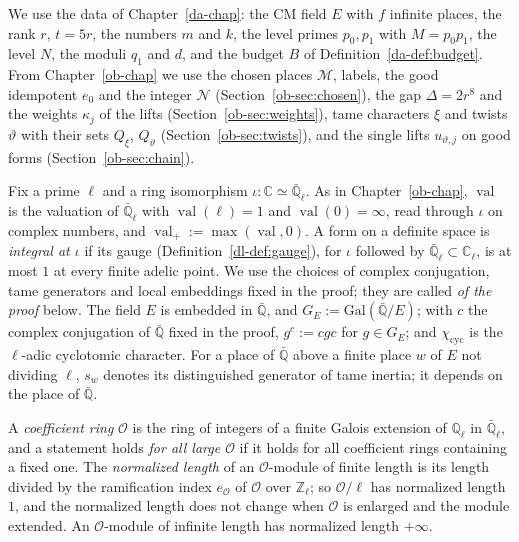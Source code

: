 \documentclass[reqno]{amsart}
\newcounter{chap}
\theoremstyle{definition}
\theoremstyle{plain}
\newcommand{\Z}{\mathbb{Z}}
\newcommand{\Q}{\mathbb{Q}}
\newcommand{\C}{\mathbb{C}}
\newcommand{\Oc}{\mathcal{O}}
\newcommand{\cyc}{\chi_{\mathrm{cyc}}}
\newcommand{\val}{\operatorname{val}}
\begin{document}
We use the data of Chapter~\ref{da-chap}: the CM field \(E\) with \(f\) infinite places, the rank \(r\), \(t = 5r\), the numbers \(m\) and \(k\), the level primes \(p_0, p_1\) with \(M = p_0p_1\), the level \(N\), the moduli \(q_1\) and \(d\), and the budget \(B\) of Definition~\ref{da-def:budget}.  From Chapter~\ref{ob-chap} we use the chosen places \(\mathcal M\), labels, the good idempotent \(e_0\) and the integer \(\mathcal N\) (Section~\ref{ob-sec:chosen}), the gap \(\Delta = 2r^8\) and the weights \(\kappa_j\) of the lifts (Section~\ref{ob-sec:weights}), tame characters \(\xi\) and twists \(\vartheta\) with their sets \(Q_\xi\), \(Q_\vartheta\) (Section~\ref{ob-sec:twists}), and the single lifts \(u_{\vartheta,j}\) on good forms (Section~\ref{ob-sec:chain}).

Fix a prime \(\ell\) and a ring isomorphism \(\iota \colon \C \simeq \bar{\Q}_\ell\).  As in Chapter~\ref{ob-chap}, \(\val\) is the valuation of \(\bar{\Q}_\ell\) with \(\val(\ell) = 1\) and \(\val(0) = \infty\), read through \(\iota\) on complex numbers, and \(\val_+ := \max(\val, 0)\).  A form on a definite space is \emph{integral at \(\iota\)} if its gauge (Definition~\ref{dl-def:gauge}), for \(\iota\) followed by \(\bar{\Q}_\ell \subset \C_\ell\), is at most \(1\) at every finite adelic point.  We use the choices of complex conjugation, tame generators and local embeddings fixed in the proof; they are called \emph{of the proof} below.  The field \(E\) is embedded in \(\bar{\Q}\), and \(G_E := \mathrm{Gal}(\bar{\Q}/E)\); with \(c\) the complex conjugation of \(\bar{\Q}\) fixed in the proof, \(g^c := cgc\) for \(g \in G_E\); and \(\cyc\) is the \(\ell\)-adic cyclotomic character.  For a place of \(\bar{\Q}\) above a finite place \(w\) of \(E\) not dividing \(\ell\), \(s_w\) denotes its distinguished generator of tame inertia; it depends on the place of \(\bar{\Q}\).

A \emph{coefficient ring} \(\Oc\) is the ring of integers of a finite Galois extension of \(\Q_\ell\) in \(\bar{\Q}_\ell\), and a statement holds \emph{for all large \(\Oc\)} if it holds for all coefficient rings containing a fixed one.  The \emph{normalized length} of an \(\Oc\)-module of finite length is its length divided by the ramification index \(e_{\Oc}\) of \(\Oc\) over \(\Z_\ell\); so \(\Oc/\ell\) has normalized length \(1\), and the normalized length does not change when \(\Oc\) is enlarged and the module extended.  An \(\Oc\)-module of infinite length has normalized length \(+\infty\).
\end{document}
